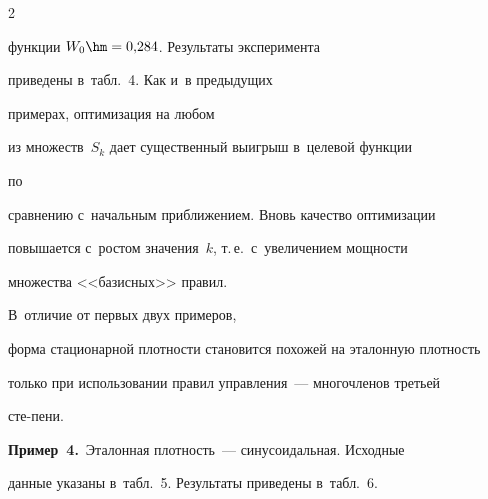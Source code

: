 \begin{multicols}{2}











\noindent


 функции $W_0\hm=0{,}284$. Результаты эксперимента 


приведены в~табл.~4. Как и~в предыду\-щих


 примерах, оптимизация на любом 


из множеств~$S_k$ дает существенный выигрыш в~целевой функции


 по 


сравнению с~начальным при\-бли\-же\-ни\-ем. Вновь качество оптимизации 


повышается с~ростом значения~$k$, т.\,е.\ с~увеличением мощ\-ности 


множества <<базисных>> правил. 





В~отличие от первых двух примеров, 


форма стационарной плот\-ности становится похожей на эталонную плотность 


только при использовании правил управ\-ле\-ния~--- многочленов третьей 


сте-\linebreak пени.











  







  \smallskip


  







  \noindent


  \textbf{Пример~4.}\ Эталонная плот\-ность~--- синусоидальная. Исходные 


данные указаны в~табл.~5. Результаты приведены в~табл.~6. 


%



\end{multicols}
